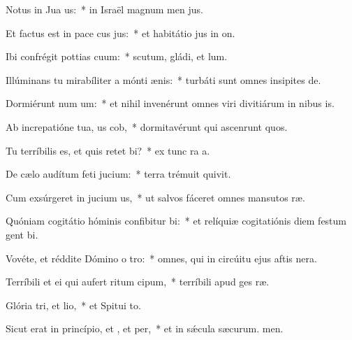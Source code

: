 \item Notus in Jua us:~* in Israël magnum men jus.
\item Et factus est in pace cus jus:~* et habitátio jus in on.
\item Ibi confrégit pottias cuum:~* scutum, gládi, et lum.
\item Illúminans tu mirabíliter a mónti ænis:~* turbáti sunt omnes insipites de.
\item Dormiérunt num um:~* et nihil invenérunt omnes viri divitiárum in nibus is.
\item Ab increpatióne tua, us cob,~* dormitavérunt qui ascenrunt quos.
\item Tu terríbilis es, et quis retet bi?~* ex tunc ra a.
\item De cælo audítum feti jucium:~* terra trémuit  quivit.
\item Cum exsúrgeret in jucium us,~* ut salvos fáceret omnes mansutos ræ.
\item Quóniam cogitátio hóminis confibitur bi:~* et relíquiæ cogitatiónis diem festum gent bi.
\item Vovéte, et réddite Dómino o tro:~* omnes, qui in circúitu ejus aftis nera.
\item Terríbili et ei qui aufert ritum cipum,~* terríbili apud ges ræ.
\item Glória tri, et lio,~* et Spitui to.
\item Sicut erat in princípio, et , et per,~* et in sǽcula sæcurum. men.
